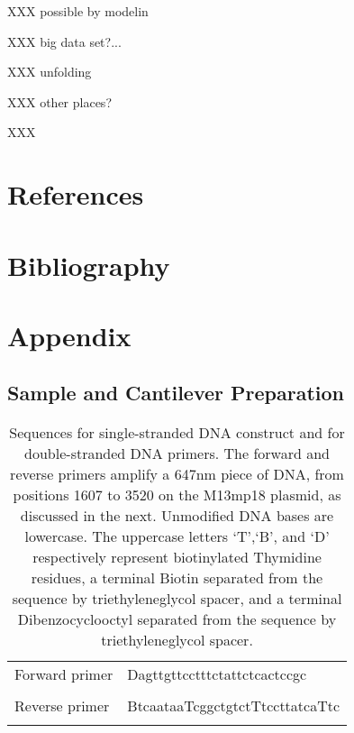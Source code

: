 \documentclass[%
  aip,12pt,tightenlines,
  amsthm,
 amsmath,amssymb
]{article}
\newcommand{\e}[0]{\\ \hline}
\newcommand{\tLabel}[1]{\label{table:#1}}
\newcommand{\sLabel}[1]{\label{section:#1}}
\begin{document}
XXX possible by modelin 

XXX big data set?...

XXX unfolding

XXX other places?

XXX


\clearpage

\section{References}



\clearpage

\section{Bibliography}

 


\clearpage

\section{Appendix}

\renewcommand{\thepage}{S\arabic{page}} 
\renewcommand{\thesection}{S\arabic{section}}  
\renewcommand{\thetable}{S\arabic{table}}  
\renewcommand{\thefigure}{S\arabic{figure}} 
\setcounter{figure}{0}
\setcounter{table}{0}


\subsection{\sLabel{SampleDetails}Sample and Cantilever Preparation}


\begin{table}
\begin{tabularx}{\textwidth}{ l | l  }
\hline \hline
Forward primer & Dagttgttcctttctattctcactccgc \\ \e 
Reverse primer & BtcaataaTcggctgtctTtccttatcaTtc \\ \e 
\end{tabularx}
\caption[DNA primer sequences]{\tLabel{Sequences}Sequences for single-stranded DNA construct and for double-stranded DNA primers. The forward and reverse primers amplify a 647nm piece of DNA, from positions 1607 to 3520 on the M13mp18 plasmid, as discussed in the next. Unmodified DNA bases are lowercase. The uppercase letters `T',`B', and `D' respectively represent biotinylated Thymidine residues, a terminal Biotin separated from the sequence by triethyleneglycol spacer, and a terminal Dibenzocyclooctyl separated from the sequence by triethyleneglycol spacer.}
\end{table}
\end{document}
